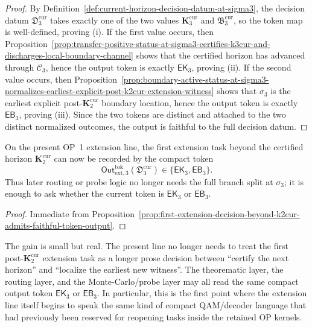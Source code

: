 \begin{proof}
By Definition~\ref{def:current-horizon-decision-datum-at-sigma3}, the decision datum \(\mathfrak D_3^{\mathrm{cur}}\) takes exactly one of the two values \(\mathbf K_3^{\mathrm{cur}}\) and \(\mathfrak B_3^{\mathrm{cur}}\), so the token map is well-defined, proving (i). If the first value occurs, then Proposition~\ref{prop:transfer-positive-status-at-sigma3-certifies-k3cur-and-discharges-local-boundary-channel} shows that the certified horizon has advanced through \(\mathcal C_3\), hence the output token is exactly \(\mathsf{EK}_3\), proving (ii). If the second value occurs, then Proposition~\ref{prop:boundary-active-status-at-sigma3-normalizes-earliest-explicit-post-k2cur-extension-witness} shows that \(\sigma_3\) is the earliest explicit post-\(\mathbf K_2^{\mathrm{cur}}\) boundary location, hence the output token is exactly \(\mathsf{EB}_3\), proving (iii). Since the two tokens are distinct and attached to the two distinct normalized outcomes, the output is faithful to the full decision datum.
\end{proof}

\begin{corollary}
\label{cor:extension-tasks-at-first-post-k2cur-slot-are-now-token-normalized}
On the present OP~1 extension line, the first extension task beyond the certified horizon \(\mathbf K_2^{\mathrm{cur}}\) can now be recorded by the compact token
\[
 \mathsf{Out}^{\mathrm{tok}}_{\mathrm{ext},3}(\mathfrak D_3^{\mathrm{cur}})\in\{\mathsf{EK}_3,\mathsf{EB}_3\}.
\]
Thus later routing or probe logic no longer needs the full branch split at \(\sigma_3\); it is enough to ask whether the current token is \(\mathsf{EK}_3\) or \(\mathsf{EB}_3\).
\end{corollary}

\begin{proof}
Immediate from Proposition~\ref{prop:first-extension-decision-beyond-k2cur-admits-faithful-token-output}.
\end{proof}

\begin{remark}
\label{rem:what-first-extension-output-tokens-now-buy}
The gain is small but real. The present line no longer needs to treat the first post-\(\mathbf K_2^{\mathrm{cur}}\) extension task as a longer prose decision between ``certify the next horizon'' and ``localize the earliest new witness''. The theorematic layer, the routing layer, and the Monte-Carlo/probe layer may all read the same compact output token \(\mathsf{EK}_3\) or \(\mathsf{EB}_3\). In particular, this is the first point where the extension line itself begins to speak the same kind of compact QAM/decoder language that had previously been reserved for reopening tasks inside the retained OP kernels.
\end{remark}



